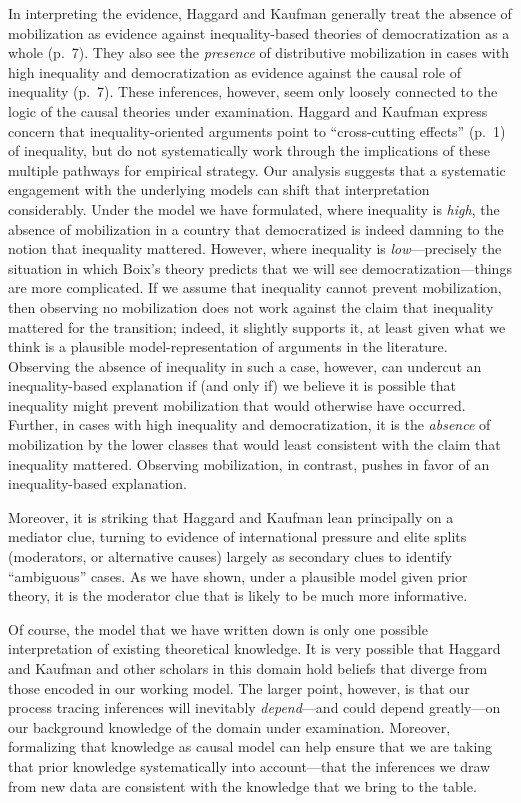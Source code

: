 \documentclass[
  12pt,
]{book}
\begin{document}
In interpreting the evidence, Haggard and Kaufman generally treat the absence of mobilization as evidence against inequality-based theories of democratization as a whole (p.~7). They also see the \emph{presence} of distributive mobilization in cases with high inequality and democratization as evidence against the causal role of inequality (p.~7). These inferences, however, seem only loosely connected to the logic of the causal theories under examination. Haggard and Kaufman express concern that inequality-oriented arguments point to ``cross-cutting effects'' (p.~1) of inequality, but do not systematically work through the implications of these multiple pathways for empirical strategy. Our analysis suggests that a systematic engagement with the underlying models can shift that interpretation considerably. Under the model we have formulated, where inequality is \emph{high}, the absence of mobilization in a country that democratized is indeed damning to the notion that inequality mattered. However, where inequality is \emph{low}---precisely the situation in which Boix's theory predicts that we will see democratization---things are more complicated. If we assume that inequality cannot prevent mobilization, then observing no mobilization does not work against the claim that inequality mattered for the transition; indeed, it slightly supports it, at least given what we think is a plausible model-representation of arguments in the literature. Observing the absence of inequality in such a case, however, can undercut an inequality-based explanation if (and only if) we believe it is possible that inequality might prevent mobilization that would otherwise have occurred. Further, in cases with high inequality and democratization, it is the \emph{absence} of mobilization by the lower classes that would least consistent with the claim that inequality mattered. Observing mobilization, in contrast, pushes in favor of an inequality-based explanation.

Moreover, it is striking that Haggard and Kaufman lean principally on a mediator clue, turning to evidence of international pressure and elite splits (moderators, or alternative causes) largely as secondary clues to identify ``ambiguous'' cases. As we have shown, under a plausible model given prior theory, it is the moderator clue that is likely to be much more informative.

Of course, the model that we have written down is only one possible interpretation of existing theoretical knowledge. It is very possible that Haggard and Kaufman and other scholars in this domain hold beliefs that diverge from those encoded in our working model. The larger point, however, is that our process tracing inferences will inevitably \emph{depend}---and could depend greatly---on our background knowledge of the domain under examination. Moreover, formalizing that knowledge as causal model can help ensure that we are taking that prior knowledge systematically into account---that the inferences we draw from new data are consistent with the knowledge that we bring to the table.
\end{document}
